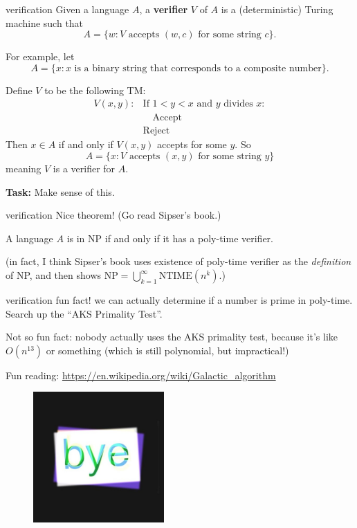 \documentclass{beamer}
\begin{document}
\begin{frame}{verification}
Given a language $A$, a \textbf{verifier} $V$ of $A$ is a (deterministic) Turing machine such that
$$A = \{w: \text{$V$ accepts $(w, c)$ for some string $c$}\}.$$

\vspace{2mm}

For example, let $$A = \{x: \text{$x$ is a binary string that corresponds to a composite number}\}.$$

Define $V$ to be the following TM:
\begin{align*}
V(x, y): &\text{If $1 < y < x$ and $y$ divides $x$}:\\
&\quad \text{Accept}\\
&\text{Reject}
\end{align*}
Then $x \in A$ if and only if $V(x, y)$ accepts for some $y$. So
$$A = \{x: \text{$V$ accepts $(x, y)$ for some string $y$}\}$$
meaning $V$ is a verifier for $A$.

\textbf{Task:} Make sense of this.


\end{frame}

\begin{frame}{verification}
Nice theorem! (Go read Sipser's book.)

\begin{theorem}
A language $A$ is in NP if and only if it has a poly-time verifier.
\end{theorem}

(in fact, I think Sipser's book uses existence of poly-time verifier as the \textit{definition} of NP, and then shows $\text{NP} = \bigcup_{k = 1}^\infty \text{NTIME}(n^k)$.)

\end{frame}

\begin{frame}{verification}
fun fact! we can actually determine if a number is prime in poly-time. Search up the ``AKS Primality Test''.

\vspace{2mm}

Not so fun fact: nobody actually uses the AKS primality test, because it's like $O(n^{13})$ or something (which is still polynomial, but impractical!)

\vspace{2mm}

Fun reading: \url{https://en.wikipedia.org/wiki/Galactic_algorithm}

\begin{figure}[h]
\centering
\includegraphics[width=5cm]{img/bye.jpg}
\end{figure}

\end{frame}
\end{document}
